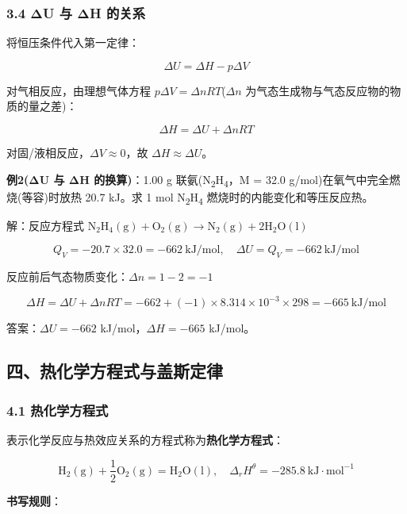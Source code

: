 \subsubsection{3.4 ΔU 与 ΔH 的关系}\label{ux3b4u-ux4e0e-ux3b4h-ux7684ux5173ux7cfb}

将恒压条件代入第一定律：

\[
\Delta U = \Delta H - p\Delta V
\]

对气相反应，由理想气体方程 \(p\Delta V = \Delta nRT\)(\(\Delta n\) 为气态生成物与气态反应物的物质的量之差)：

\[
\boxed{\Delta H = \Delta U + \Delta nRT}
\]

对固/液相反应，\(\Delta V \approx 0\)，故 \(\Delta H \approx \Delta U\)。

\textbf{例2(ΔU 与 ΔH 的换算)}：1.00 g 联氨(N\textsubscript{2}H\textsubscript{4}，M = 32.0 g/mol)在氧气中完全燃烧(等容)时放热 20.7 kJ。求 1 mol N\textsubscript{2}H\textsubscript{4} 燃烧时的内能变化和等压反应热。

解：反应方程式 \(\mathrm{N_2H_4(g) + O_2(g) \to N_2(g) + 2H_2O(l)}\)

\[Q_V = -20.7 \times 32.0 = -662\ \mathrm{kJ/mol}, \quad \Delta U = Q_V = -662\ \mathrm{kJ/mol}\]

反应前后气态物质变化：\(\Delta n = 1 - 2 = -1\)

\[\Delta H = \Delta U + \Delta nRT = -662 + (-1) \times 8.314 \times 10^{-3} \times 298 = -665\ \mathrm{kJ/mol}\]

答案：\(\Delta U = -662\) kJ/mol，\(\Delta H = -665\) kJ/mol。

\subsection{四、热化学方程式与盖斯定律}\label{ux56dbux70edux5316ux5b66ux65b9ux7a0bux5f0fux4e0eux76d6ux65afux5b9aux5f8b}

\subsubsection{4.1 热化学方程式}\label{ux70edux5316ux5b66ux65b9ux7a0bux5f0f}

表示化学反应与热效应关系的方程式称为\textbf{热化学方程式}：

\[
\mathrm{H_2(g) + \frac{1}{2}O_2(g) = H_2O(l)}, \quad \Delta_r H^\theta = -285.8\ \mathrm{kJ \cdot mol^{-1}}
\]

\textbf{书写规则}：

